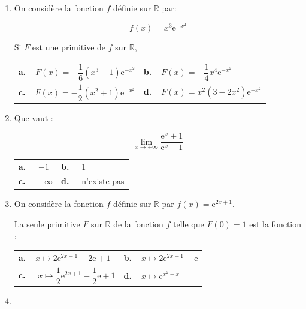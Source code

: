 \documentclass[10pt]{article}
\providecommand{\R}{\mathbb{R}}
\begin{document}
\begin{enumerate}
\begin{center}
\begin{tabularx}{\linewidth}{*{2}{X}}
$x = -1$
\end{tabularx}
\end{center}


\item On considère la fonction $f$ définie sur $\R$ par:

\[f(x) = x^3\text{e}^{-x^2}\]

Si $F$ est une primitive de $f$ sur $\R$, 

\begin{center}
\renewcommand\arraystretch{1.9}
\begin{tabularx}{\linewidth}{*{2}{X}}
\textbf{a.~~}$F(x) = - \dfrac16\left(x^3 + 1\right)\text{e}^{-x^2}$ &
\textbf{b.~~}$F(x) = - \dfrac14 x^4\text{e}^{-x^2}$\\
\textbf{c.~~}$F(x)=-\dfrac12\left(x^2 + 1\right)\text{e}^{-x^2}$&
\textbf{d.~~}$F(x)= x^2\left(3 - 2x^2\right)\text{e}^{-x^2}$
\end{tabularx}
\renewcommand\arraystretch{1}
\end{center}

\item Que vaut :

\[\displaystyle\lim_{x \to + \infty} \dfrac{\text{e}^x + 1}{\text{e}^x - 1}\]

\begin{center}
\begin{tabularx}{\linewidth}{*{2}{X}}
\textbf{a.~~} $-1$&\textbf{b.~~}  1\\
\textbf{c.~~} $+ \infty$&\textbf{d.~~} n'existe pas
\end{tabularx}
\end{center}

\item On considère la fonction $f$ définie sur $\R$ par $f(x) = \text{e}^{2x +1}$.

La seule primitive $F$ sur $\R$ de la fonction $f$ telle que $F(0) = 1$ est la fonction :

\begin{center}
\begin{tabularx}{\linewidth}{*{2}{X}}
\textbf{a.~~}$x \longmapsto  2\text{e}^{2x+1} - 2\text{e} + 1$&\textbf{b.~~}$x \longmapsto  2\text{e}^{2x+1} - \text{e}$\\
\textbf{c.~~} $x \longmapsto \dfrac12\text{e}^{2x+1} - \dfrac12 \text{e} + 1$&\textbf{d.~~}$x \longmapsto \text{e}^{x^2 + x}$
\end{tabularx}
\end{center}

\item ~


\end{enumerate}
\end{document}
